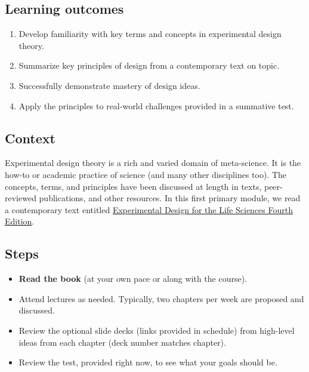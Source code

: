 \documentclass[
]{book}
\providecommand{\tightlist}{%
  \setlength{\itemsep}{0pt}\setlength{\parskip}{0pt}}
\begin{document}
\hypertarget{learning-outcomes-1}{%
\subsection*{Learning outcomes}\label{learning-outcomes-1}}

\begin{enumerate}
\def\labelenumi{\arabic{enumi}.}
\tightlist
\item
  Develop familiarity with key terms and concepts in experimental design theory.
\item
  Summarize key principles of design from a contemporary text on topic.\\
\item
  Successfully demonstrate mastery of design ideas.\\
\item
  Apply the principles to real-world challenges provided in a summative test.
\end{enumerate}

\hypertarget{context}{%
\subsection*{Context}\label{context}}

Experimental design theory is a rich and varied domain of meta-science. It is the how-to or academic practice of science (and many other disciplines too). The concepts, terms, and principles have been discussed at length in texts, peer-reviewed publications, and other resources. In this first primary module, we read a contemporary text entitled \href{https://global.oup.com/academic/product/experimental-design-for-the-life-sciences-9780198717355?cc=us\&lang=en\&}{Experimental Design for the Life Sciences Fourth Edition}.

\hypertarget{steps}{%
\subsection*{Steps}\label{steps}}

\begin{itemize}
\tightlist
\item
  \textbf{Read the book} (at your own pace or along with the course).\\
\item
  Attend lectures as needed. Typically, two chapters per week are proposed and discussed.\\
\item
  Review the optional slide decks (links provided in schedule) from high-level ideas from each chapter (deck number matches chapter).\\
\item
  Review the test, provided right now, to see what your goals should be.
\end{itemize}
\end{document}
